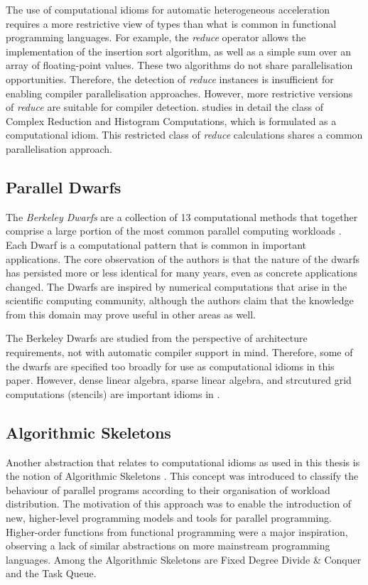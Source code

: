     The use of computational idioms for automatic heterogeneous acceleration
    requires a more restrictive view of types than what is common in
    functional programming languages.
    For example, the {\it reduce} operator allows the implementation of
    the insertion sort algorithm, as well as a simple sum over an array of
    floating-point values.
    These two algorithms do not share parallelisation opportunities.
    Therefore, the detection of {\it reduce} instances is insufficient for
    enabling compiler parallelisation approaches.
    However, more restrictive versions of {\it reduce} are suitable for
    compiler detection.
     studies in detail the class of Complex Reduction
    and Histogram Computations, which is formulated as a computational idiom.
    This restricted class of {\it reduce} calculations shares a common
    parallelisation approach.

\subsection{Parallel Dwarfs}

    The {\it Berkeley Dwarfs} are a collection of 13 computational methods
    that together comprise a large portion of the most common parallel computing
    workloads \citep{Asanovic06thelandscape}.
    Each Dwarf is a computational pattern that is common in important
    applications.
    The core observation of the authors is that the nature of the dwarfs has
    persisted more or less identical for many years, even as concrete
    applications changed.
    The Dwarfs are inspired by numerical computations that arise in the
    scientific computing community, although the authors claim that the
    knowledge from this domain may prove useful in other areas as well.

    The Berkeley Dwarfs are studied from the perspective of architecture
    requirements, not with automatic compiler support in mind.
    Therefore, some of the dwarfs are specified too broadly for use as
    computational idioms in this paper.
    However, dense linear algebra, sparse linear algebra, and strcutured grid
    computations (stencils) are important idioms in .

\subsection{Algorithmic Skeletons}

    Another abstraction that relates to computational idioms as used in this
    thesis is the notion of Algorithmic Skeletons \citep{Cole1991Algorithmic}.
    This concept was introduced to classify the behaviour of parallel programs
    according to their organisation of workload distribution.
    The motivation of this approach was to enable the introduction of new,
    higher-level programming models and tools for parallel programming.
    Higher-order functions from functional programming were a major inspiration,
    observing a lack of similar abstractions on more mainstream programming
    languages.
    Among the Algorithmic Skeletons are Fixed Degree Divide \& Conquer and the
    Task Queue.

